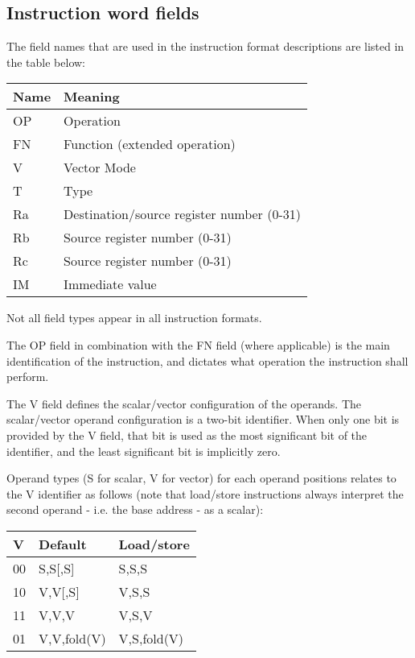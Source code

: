 \subsection{Instruction word fields}

The field names that are used in the instruction format descriptions are listed
in the table below:

\begin{tabular}{|l|l|}
  \hline
  \textbf{Name} & \textbf{Meaning} \\
  \hline
  OP & Operation \\
  \hline
  FN & Function (extended operation) \\
  \hline
  V  & Vector Mode \\
  \hline
  T  & Type \\
  \hline
  Ra & Destination/source register number (0-31) \\
  \hline
  Rb & Source register number (0-31) \\
  \hline
  Rc & Source register number (0-31) \\
  \hline
  IM & Immediate value \\
  \hline
\end{tabular}

Not all field types appear in all instruction formats.

The OP field in combination with the FN field (where applicable) is the main
identification of the instruction, and dictates what operation the instruction
shall perform.

The V field defines the scalar/vector configuration of the operands. The
scalar/vector operand configuration is a two-bit identifier. When only one bit
is provided by the V field, that bit is used as the most significant bit of the
identifier, and the least significant bit is implicitly zero.

Operand types (S for scalar, V for vector) for each operand positions relates
to the V identifier as follows (note that load/store instructions always
interpret the second operand - i.e. the base address - as a scalar):

\begin{tabular}{|l|l|l|}
  \hline
  \textbf{V} & \textbf{Default} & \textbf{Load/store} \\
  \hline
  00 & S,S[,S] & S,S,S \\
  \hline
  10 & V,V[,S] & V,S,S \\
  \hline
  11 & V,V,V & V,S,V \\
  \hline
  01 & V,V,fold(V) & V,S,fold(V) \\
  \hline
\end{tabular}

